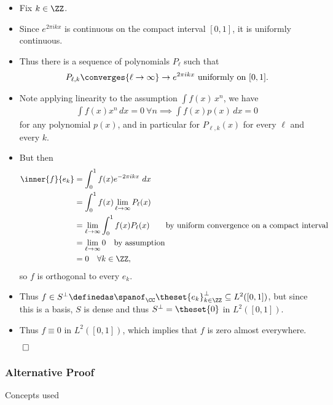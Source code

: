 \begin{solution}
\begin{itemize}
\item
  Fix \(k \in \ZZ\).
\item
  Since \(e^{2\pi i k x}\) is continuous on the compact interval
  \([0, 1]\), it is uniformly continuous.
\item
  Thus there is a sequence of polynomials \(P_\ell\) such that
  \begin{align*}
  P_{\ell, k} \converges{\ell\to\infty}\to e^{2\pi i k x} \text{ uniformly on } [0,1]
  .\end{align*}
\item
  Note applying linearity to the assumption \(\int f(x) \, x^n\), we
  have
  \begin{align*}
  \int f(x) x^n \,dx = 0 ~\forall n \implies \int f(x) p(x) \,dx = 0 
  \end{align*} for any polynomial \(p(x)\), and in particular for
  \(P_{\ell, k}(x)\) for every \(\ell\) and every \(k\).
\item
  But then\\
  \begin{align*}
  \inner{f}{e_k} 
  &= \int_0^1 f(x) e^{-2\pi i k x} ~dx \\
  &= \int_0^1 f(x) \lim_{\ell \to \infty} P_\ell(x) \\
  &= \lim_{\ell \to \infty}  \int_0^1 f(x) P_\ell(x) \quad\quad \text{by uniform convergence on a compact interval} \\
  &= \lim_{\ell \to \infty} 0 \quad\text{by assumption}\\
  &= 0 \quad \forall k\in \ZZ
  ,\end{align*} so \(f\) is orthogonal to every \(e_k\).
\item
  Thus
  \(f\in S^\perp \definedas \spanof_\CC\theset{e_k}_{k\in \ZZ}^\perp \subseteq L^2([0, 1])\),
  but since this is a basis, \(S\) is dense and thus
  \(S^\perp = \theset{0}\) in \(L^2([0, 1])\).
\item
  Thus \(f\equiv 0\) in \(L^2([0, 1])\), which implies that \(f\) is
  zero almost everywhere.
\end{itemize}

\(\qed\)

\hypertarget{alternative-proof}{%
\subsubsection{Alternative Proof}\label{alternative-proof}}

Concepts used


\end{solution}
